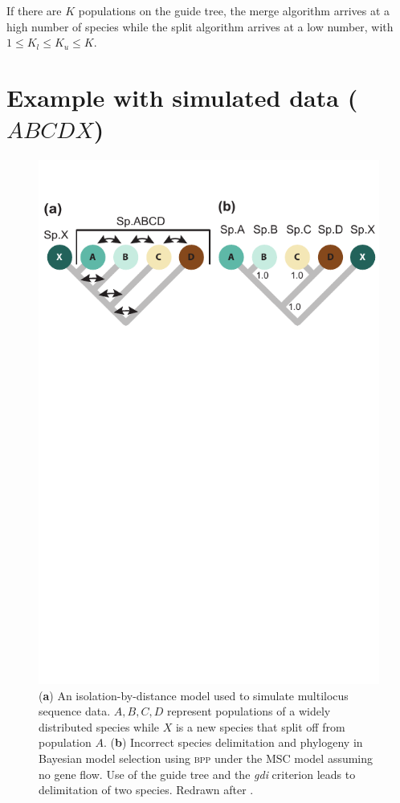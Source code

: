 \documentclass[A4]{article1}
\begin{document}
If there are $K$ populations on the guide tree, the merge algorithm arrives at a high
number of species while the split algorithm arrives at a low number, with $1 \le K_l \le
K_u \le K $.


\section{Example with simulated data ($ABCDX$)}

\begin{figure}[t]
   \centering
   \includegraphics[scale=0.7]{figs/fig-ABCDX}
   
   \caption{(\textbf{a}) An isolation-by-distance model used to simulate multilocus
    sequence data.  $A, B, C, D$ represent populations of a widely distributed species
    while $X$ is a new species that split off from population $A$.  (\textbf{b}) Incorrect
    species delimitation and phylogeny in Bayesian model selection using \textsc{bpp} under
    the MSC model assuming no gene flow.  Use of the guide tree and the \textit{gdi}
    criterion leads to delimitation of two species.  Redrawn after
    \citet[][fig.~5]{Leache2019}. %
} \label{fig:ABCDX}
\end{figure}
\end{document}
